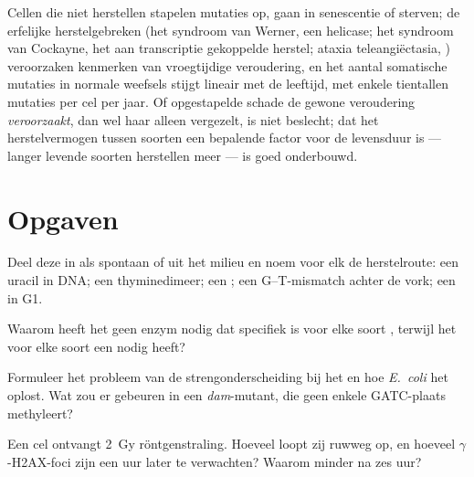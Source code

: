 \begin{remark}\label{rem:b3:dna-repair:ageing}
Cellen die niet herstellen stapelen mutaties op, gaan in senescentie of
sterven; de erfelijke herstelgebreken (het syndroom van Werner, een
helicase; het syndroom van Cockayne, het aan transcriptie gekoppelde
herstel; ataxia teleangiëctasia, ) veroorzaken kenmerken van
vroegtijdige veroudering, en het aantal somatische mutaties in normale
weefsels stijgt lineair met de leeftijd, met enkele tientallen mutaties
per cel per jaar. Of opgestapelde schade de gewone veroudering
\emph{veroorzaakt}, dan wel haar alleen vergezelt, is niet beslecht;
dat het herstelvermogen tussen soorten een bepalende factor voor de
levensduur is --- langer levende soorten herstellen meer --- is goed
onderbouwd.
\end{remark}

\section{Opgaven}

\begin{exercise}[$\star$]\label{exo:b3:dna-repair:1}
Deel deze  in als spontaan of uit het milieu en noem voor elk de
herstelroute: een uracil in DNA; een thyminedimeer; een ;
een G--T-mismatch achter de vork; een  in G1.
\end{exercise}

\begin{exercise}[$\star$]\label{exo:b3:dna-repair:2}
Waarom heeft het  geen enzym nodig dat
specifiek is voor elke soort , terwijl het 
voor elke soort een  nodig heeft?
\end{exercise}

\begin{exercise}[$\star$]\label{exo:b3:dna-repair:3}
Formuleer het probleem van de strengonderscheiding bij het
 en hoe \emph{E.~coli} het oplost. Wat zou er gebeuren
in een \emph{dam}-mutant, die geen enkele GATC-plaats methyleert?
\end{exercise}

\begin{exercise}[$\star$]\label{exo:b3:dna-repair:4}
Een cel ontvangt \qty{2}{Gy} röntgenstraling. Hoeveel
 loopt zij ruwweg op, en hoeveel
$\gamma$-H2AX-foci zijn een uur later te verwachten? Waarom minder na
zes uur?
\end{exercise}

